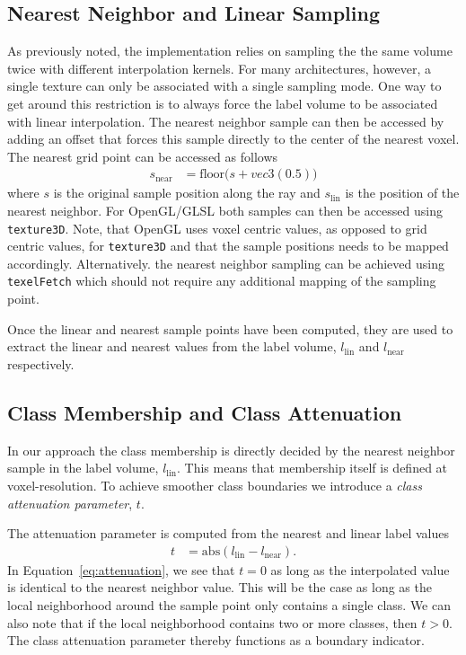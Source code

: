 \documentclass{egpubl}
\begin{document}
\subsection*{Nearest Neighbor and Linear Sampling}

As previously noted, the implementation relies on sampling the the same volume twice with different interpolation kernels. For many architectures, however, a single texture can only be associated with a single sampling mode. One way to get around this restriction is to always force the label volume to be associated with linear interpolation. The nearest neighbor sample can then be accessed by adding an offset that forces this sample directly to the center of the nearest voxel. The nearest grid point can be accessed as follows
\begin{align}
s_\mathrm{near} &= \mathrm{floor}\big(s + vec3(0.5)\big) \label{eq:near}  
\end{align}
where $s$ is the original sample position along the ray and $s_\mathrm{lin}$ is the position of the nearest neighbor. For OpenGL/GLSL both samples can then be accessed using \texttt{texture3D}. Note, that OpenGL uses voxel centric values, as opposed to grid centric values, for \texttt{texture3D} and that the sample positions needs to be mapped accordingly.
 Alternatively. the nearest neighbor sampling can be achieved using \texttt{texelFetch} which should not require any additional mapping of the sampling point.

Once the linear and nearest sample points have been computed, they are used to extract the linear and nearest values from the label volume, $l_\mathrm{lin}$ and $l_\mathrm{near}$ respectively.

\subsection*{Class Membership and Class Attenuation}

In our approach the class membership is directly decided by the nearest neighbor sample in the label volume, $l_\mathrm{lin}$. This means that membership itself is defined at voxel-resolution. To achieve smoother class boundaries we introduce a \emph{class attenuation parameter}, $t$.

The attenuation parameter is computed from the nearest and linear label values
\begin{align}
t &= \mathrm{abs}(l_\mathrm{lin} - l_\mathrm{near})  .  \label{eq:attenuation}
\end{align}
In Equation~\ref{eq:attenuation}, we see that $t=0$ as long as the interpolated value is identical to the nearest neighbor value. This will be the case as long as the local neighborhood around the sample point only contains a single class. We can also note that if the local neighborhood contains two or more classes, then $t > 0$. The class attenuation parameter thereby functions as a boundary indicator.
\end{document}
